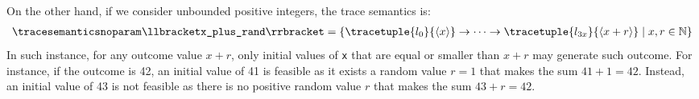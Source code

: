 \begin{example}
On the other hand, if we consider unbounded positive integers, the trace semantics is:
\begin{align*}
  \tracesemanticsnoparam\semanticsof{\texttt{x\_plus\_rand}}
  =
  \setdef{
    \tracetuple{\locinit}{\langle{x}\rangle}\tracearrow\tracetuple{\loc{3x}}{\langle{x+r}\rangle}
  }{x, r \in \N}
\end{align*}
In such instance, for any outcome value $x+r$, only initial values of \texttt{x} that are equal or smaller than $x+r$ may generate such outcome.
For instance, if the outcome is 42, an initial value of 41 is feasible as it exists a random value $r = 1$ that makes the sum $41 + 1 = 42$. Instead, an initial value of 43 is not feasible as there is no positive random value $r$ that makes the sum $43 + r = 42$.
\end{example}

